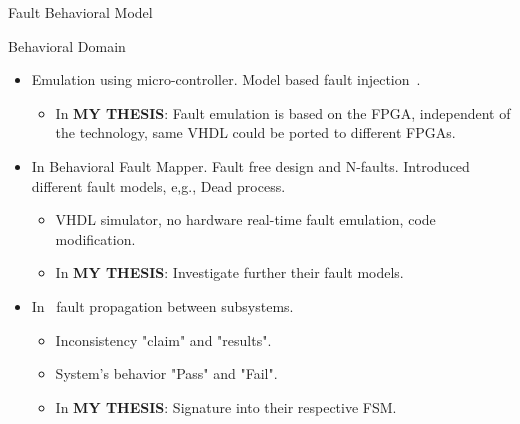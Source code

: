 \documentclass[aspectratio=1610]{beamer}
\begin{document}
\begin{frame}{Fault Behavioral Model}

\begin{block}{Behavioral  Domain}
\end{block}
\begin{itemize}
\item Emulation using micro-controller. Model based fault injection~\citep{Svenningsson2010}.
\begin{itemize}
\item In \textbf{MY THESIS}: Fault emulation is based on the FPGA, independent of the technology, same VHDL could be ported to different FPGAs.

\end{itemize}

\item In \citep{hayne1999behavioral} Behavioral Fault Mapper. Fault free design and N-faults.  Introduced different fault models, e,g., Dead process.

\begin{itemize}
\item VHDL simulator, no hardware real-time fault emulation, code modification.

\item In \textbf{MY THESIS}: Investigate further their fault models.
\end{itemize}

\item In~\citep{chen2017fault} fault propagation between subsystems.

\begin{itemize}

\item Inconsistency "claim" and "results".

\item System's behavior "Pass" and "Fail".

\item In \textbf{MY THESIS}: Signature into their respective FSM.

\end{itemize} 
\end{itemize}







\end{frame}
\end{document}
